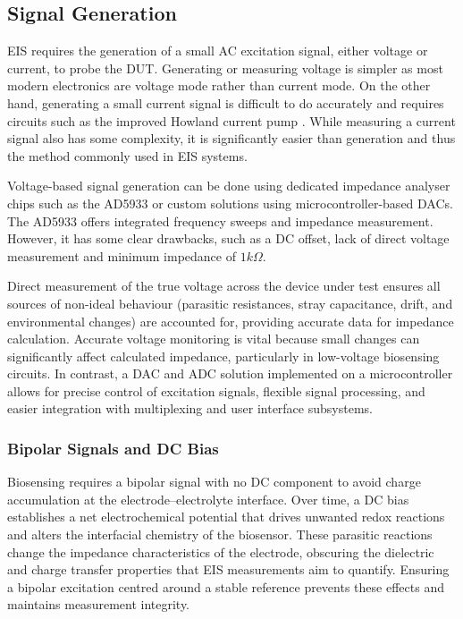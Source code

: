 
\subsection{Signal Generation}
\Ac{EIS} requires the generation of a small AC excitation signal, either voltage or current, to probe the \ac{DUT}. Generating or measuring voltage is simpler as most modern electronics are voltage mode rather than current mode. On the other hand, generating a small current signal is difficult to do accurately and requires circuits such as the improved Howland current pump \cite{ImprovedHowlandCurrent2020}. While measuring a current signal also has some complexity, it is significantly easier than generation and thus the method commonly used in \ac{EIS} systems.

Voltage-based signal generation can be done using dedicated impedance analyser chips such as the AD5933 or custom solutions using microcontroller-based \acp{DAC}. The AD5933 offers integrated frequency sweeps and impedance measurement. However, it has some clear drawbacks, such as a DC offset, lack of direct voltage measurement and minimum impedance of $1 k\Omega$.

Direct measurement of the true voltage across the device under test ensures all sources of non-ideal behaviour (parasitic resistances, stray capacitance, drift, and environmental changes) are accounted for, providing accurate data for impedance calculation. Accurate voltage monitoring is vital because small changes can significantly affect calculated impedance, particularly in low-voltage biosensing circuits. In contrast, a DAC and ADC solution implemented on a microcontroller allows for precise control of excitation signals, flexible signal processing, and easier integration with multiplexing and user interface subsystems.

\subsubsection{Bipolar Signals and DC Bias}
Biosensing requires a bipolar signal with no DC component to avoid charge accumulation at the electrode–electrolyte interface. Over time, a DC bias establishes a net electrochemical potential that drives unwanted redox reactions and alters the interfacial chemistry of the biosensor. These parasitic reactions change the impedance characteristics of the electrode, obscuring the dielectric and charge transfer properties that \ac{EIS} measurements aim to quantify. Ensuring a bipolar excitation centred around a stable reference prevents these effects and maintains measurement integrity.


